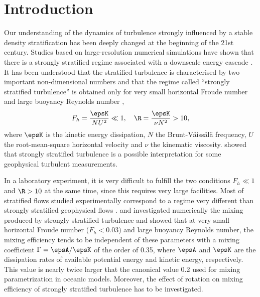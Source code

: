 \section{Introduction} 

\noindent
Our understanding of the dynamics of turbulence strongly influenced by a stable
density stratification has been deeply changed at the beginning of the 21st
century.
%
Studies based on large-resolution numerical simulations have shown that there
is a strongly stratified regime associated with a downscale energy cascade
\cite[]{RileyDeBruynKops2003, Lindborg2006}.
%
It has been understood that the stratified turbulence is characterised by two
important non-dimensional numbers and that the regime called ``strongly
stratified turbulence'' is obtained only for very small horizontal Froude
number and large buoyancy Reynolds number \cite[]{Billant2001,
BrethouwerBillantLindborg2007},
\begin{equation}
 F_h = \frac{\epsK}{N U^2} \ll 1,\quad \R = \frac{\epsK}{\nu N^2} > 10,
\label{eq:FhR}
\end{equation}
where $\epsK$ is the kinetic energy dissipation, $N$ the
Brunt-V\"{a}iss\"{a}l\"{a} frequency, $U$ the root-mean-square horizontal
velocity and $\nu$ the kinematic viscosity.
%
\cite{RileyLindborg2008} showed that strongly stratified turbulence is a
possible interpretation for some geophysical turbulent measurements.

\noindent In a laboratory experiment, it is very difficult to fulfill the two conditions $F_h \ll 1$ and $\R > 10$ at the same time, since this requires very large
facilities.
%
Most of stratified flows studied experimentally
correspond to a regime very different than strongly stratified geophysical
flows \cite[see for example][]{PraudFinchamSommeria2005,
AugierBillantNegrettiChomaz2013, AugierBillantChomaz2015}.
%
\cite{BrethouwerLindborg2009} and \cite{Maffioli2016} investigated numerically
the mixing produced by strongly stratified turbulence and showed that at very
small horizontal Froude number ($F_h < 0.03$) and large buoyancy Reynolds
number, the mixing efficiency tends to be independent of these parameters with
a mixing coefficient $\Gamma = \epsA/\epsK$ of the order of 0.35, where $\epsA$
and $\epsK$ are the dissipation rates of available potential energy and kinetic
energy, respectively. This value is nearly twice larger that the canonical
value 0.2 used for mixing parametrization in oceanic models. Moreover, the
effect of rotation on mixing efficiency of strongly stratified
turbulence has to be investigated.

